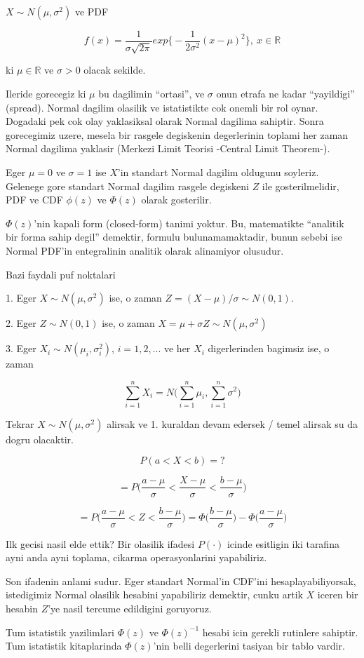 \documentclass[12pt,fleqn]{article}
\begin{document}
$X \sim N(\mu, \sigma^2)$ ve PDF

\[ f(x) = \frac{1}{\sigma\sqrt{2\pi}} 
exp \bigg\{ - \frac{1}{2\sigma^2}(x-\mu)^2  \bigg\}
, \ x \in \mathbb{R}
\]

ki $\mu \in \mathbb{R}$ ve $\sigma > 0$ olacak sekilde.

Ileride gorecegiz ki $\mu$ bu dagilimin ``ortasi'', ve $\sigma$ onun
etrafa ne kadar ``yayildigi'' (spread). Normal dagilim olasilik ve
istatistikte cok onemli bir rol oynar. Dogadaki pek cok olay
yaklasiksal olarak Normal dagilima sahiptir. Sonra gorecegimiz uzere,
mesela bir rasgele degiskenin degerlerinin toplami her zaman Normal
dagilima yaklasir (Merkezi Limit Teorisi -Central Limit Theorem-). 

Eger $\mu = 0$ ve $\sigma = 1$ ise $X$'in standart Normal dagilim oldugunu
soyleriz. Gelenege gore standart Normal dagilim rasgele degiskeni $Z$ ile
gosterilmelidir, PDF ve CDF $\phi(z)$ ve $\Phi(z)$ olarak gosterilir. 

$\Phi(z)$'nin kapali form (closed-form) tanimi yoktur. Bu, matematikte
``analitik bir forma sahip degil'' demektir, formulu bulunamamaktadir,
bunun sebebi ise Normal PDF'in entegralinin analitik olarak alinamiyor
olusudur. 

Bazi faydali puf noktalari

1. Eger $X \sim N(\mu, \sigma^2)$ ise, o zaman $Z = (X-\mu) / \sigma \sim
N(0,1)$. 

2. Eger $Z \sim N(0,1)$ ise, o zaman $X = \mu + \sigma Z \sim N(\mu,\sigma^2)$

3. Eger $X_i \sim N(\mu_i, \sigma_i^2)$, $i=1,2,...$ ve her $X_i$
digerlerinden bagimsiz ise, o zaman 

\[ \sum_{i=1}^n X_i = N\bigg( \sum_{i=1}^n\mu_i, \sum_{i=1}^n\sigma^2 \bigg) \]

Tekrar $X \sim N(\mu, \sigma^2)$ alirsak ve 1. kuraldan devam edersek /
temel alirsak su da dogru olacaktir. 

\[ P(a < X < b) = ? \]

\[ 
= P\bigg(
\frac{a-\mu}{\sigma} < 
\frac{X-\mu}{\sigma} < 
\frac{b-\mu}{\sigma}
\bigg) 
\]

\[
= P\bigg(\frac{a-\mu}{\sigma} < Z < \frac{b-\mu}{\sigma}\bigg) 
= 
\Phi\bigg(\frac{b-\mu}{\sigma}\bigg) - 
\Phi\bigg(\frac{a-\mu}{\sigma}\bigg) 
\]

Ilk gecisi nasil elde ettik? Bir olasilik ifadesi $P(\cdot)$ icinde esitligin iki
tarafina ayni anda ayni toplama, cikarma operasyonlarini yapabiliriz. 

Son ifadenin anlami sudur. Eger standart Normal'in CDF'ini
hesaplayabiliyorsak, istedigimiz Normal olasilik hesabini yapabiliriz
demektir, cunku artik $X$ iceren bir hesabin $Z$'ye nasil tercume
edildigini goruyoruz. 

Tum istatistik yazilimlari $\Phi(z)$ ve $\Phi(z)^{-1}$ hesabi icin gerekli
rutinlere sahiptir. Tum istatistik kitaplarinda $\Phi(z)$'nin belli
degerlerini tasiyan bir tablo vardir.
\end{document}
